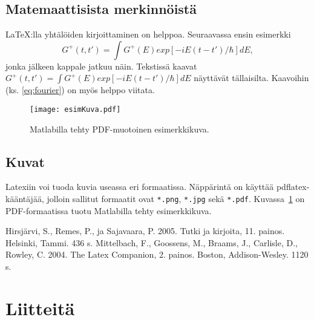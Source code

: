 \documentclass[12pt,a4paper,finnish]{vendor/tutthesis}
\begin{document}
\section{Matemaattisista merkinnöistä}

\LaTeX:lla yhtälöiden kirjoittaminen on helppoa. Seuraavassa ensin esimerkki
\begin{equation}
  \label{eq:fourier}
  G^+(t,t')= \int G^+(E) exp[-iE(t-t')/\hbar] dE,
\end{equation}
jonka jälkeen kappale jatkuu näin.
Tekstissä kaavat $G^+(t,t')= \int G^+(E) exp[-iE(t-t')/\hbar] dE$ näyttävät
tällaisilta. Kaavoihin (ks. \ref{eq:fourier}) on myös helppo viitata.

%

\begin{figure}[t]
\begin{center}
\texttt{[image: esimKuva.pdf]}
\end{center}
\caption{Matlabilla tehty PDF-muotoinen esimerkkikuva.}
\label{fig:esimKuva}
\end{figure}

\section{Kuvat}

Latexiin voi tuoda kuvia useassa eri formaatissa.
Näppärintä on käyttää pdflatex-kääntäjää, jolloin
sallitut formaatit ovat \verb+*.png+, \verb+*.jpg+
sekä \verb+*.pdf+. Kuvassa~\ref{fig:esimKuva} on
PDF-formaatissa tuotu Matlabilla tehty
esimerkkikuva.

\newpage
{} %
\renewcommand{\bibname}{Lähteet}
\begin{thebibliography}{99}
 Hirsjärvi, S., Remes, P., ja Sajavaara, P. 2005. Tutki ja
  kirjoita, 11. painos. Helsinki, Tammi. 436 s.
 Mittelbach, F., Goossens, M., Braams, J.,
Carlisle, D., Rowley, C. 2004. The Latex Companion, 2. painos. Boston, Addison-Wesley. 1120 s.

\end{thebibliography}

%
%

\appendix
\renewcommand{\chaptername}{Liite}

\chapter{Liitteitä}
\end{document}
